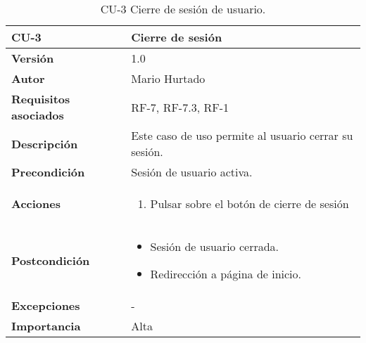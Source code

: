 \begin{table}[p]
	\centering
	\begin{tabularx}{\linewidth}{ p{} p{} }
			\toprule
			\textbf{CU-3}    & \textbf{Cierre de sesión}\\
			\toprule
			\textbf{Versión}              & 1.0    \\
			\textbf{Autor}                & Mario Hurtado \\
			\textbf{Requisitos asociados} & RF-7, RF-7.3, RF-1 \\
			\textbf{Descripción}          & Este caso de uso permite al usuario cerrar su sesión. \\
			\textbf{Precondición}         &  Sesión de usuario activa.\\
			\textbf{Acciones}             &
			\begin{enumerate}
					\def\labelenumi{\arabic{enumi}.}
					\tightlist
					\item Pulsar sobre el botón de cierre de sesión
				\end{enumerate}\\
			\textbf{Postcondición}        &  \begin{itemize}
				\item Sesión de usuario cerrada.
				\item Redirección a página de inicio.
			\end{itemize} \\
			\textbf{Excepciones}          & - \\
			\textbf{Importancia}          & Alta \\
			\bottomrule
		\end{tabularx}
	\caption{CU-3 Cierre de sesión de usuario.}
\end{table}
%
